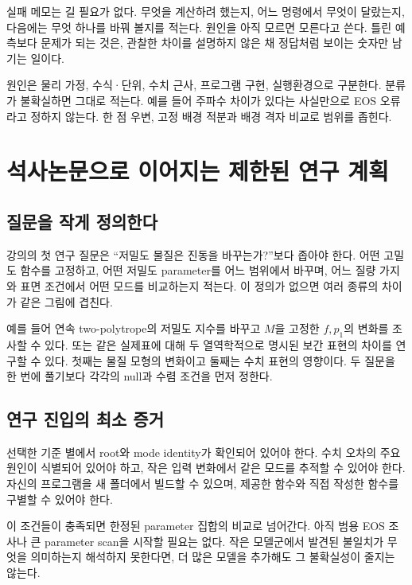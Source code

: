 \documentclass[
  10pt,
  a4paper,
]{article}
\begin{document}
실패 메모는 길 필요가 없다. 무엇을 계산하려 했는지, 어느 명령에서 무엇이
달랐는지, 다음에는 무엇 하나를 바꿔 볼지를 적는다. 원인을 아직 모르면
모른다고 쓴다. 틀린 예측보다 문제가 되는 것은, 관찰한 차이를 설명하지
않은 채 정답처럼 보이는 숫자만 남기는 일이다.

원인은 물리 가정, 수식·단위, 수치 근사, 프로그램 구현, 실행환경으로
구분한다. 분류가 불확실하면 그대로 적는다. 예를 들어 주파수 차이가
있다는 사실만으로 EOS 오류라고 정하지 않는다. 한 점 우변, 고정 배경
적분과 배경 격자 비교로 범위를 좁힌다.

\section{석사논문으로 이어지는 제한된 연구
계획}\label{uxc11duxc0acuxb17cuxbb38uxc73cuxb85c-uxc774uxc5b4uxc9c0uxb294-uxc81cuxd55cuxb41c-uxc5f0uxad6c-uxacc4uxd68d}

\subsection{질문을 작게
정의한다}\label{uxc9c8uxbb38uxc744-uxc791uxac8c-uxc815uxc758uxd55cuxb2e4}

강의의 첫 연구 질문은 ``저밀도 물질은 진동을 바꾸는가?''보다 좁아야
한다. 어떤 고밀도 함수를 고정하고, 어떤 저밀도 parameter를 어느 범위에서
바꾸며, 어느 질량 가지와 표면 조건에서 어떤 모드를 비교하는지 적는다. 이
정의가 없으면 여러 종류의 차이가 같은 그림에 겹친다.

예를 들어 연속 two-polytrope의 저밀도 지수를 바꾸고 \(M\)을 고정한
\(f,p_1\)의 변화를 조사할 수 있다. 또는 같은 실제표에 대해 두
열역학적으로 명시된 보간 표현의 차이를 연구할 수 있다. 첫째는 물질
모형의 변화이고 둘째는 수치 표현의 영향이다. 두 질문을 한 번에 풀기보다
각각의 null과 수렴 조건을 먼저 정한다.

\subsection{연구 진입의 최소
증거}\label{uxc5f0uxad6c-uxc9c4uxc785uxc758-uxcd5cuxc18c-uxc99duxac70}

선택한 기준 별에서 root와 mode identity가 확인되어 있어야 한다. 수치
오차의 주요 원인이 식별되어 있어야 하고, 작은 입력 변화에서 같은 모드를
추적할 수 있어야 한다. 자신의 프로그램을 새 폴더에서 빌드할 수 있으며,
제공한 함수와 직접 작성한 함수를 구별할 수 있어야 한다.

이 조건들이 충족되면 한정된 parameter 집합의 비교로 넘어간다. 아직 범용
EOS 조사나 큰 parameter scan을 시작할 필요는 없다. 작은 모델군에서
발견된 불일치가 무엇을 의미하는지 해석하지 못한다면, 더 많은 모델을
추가해도 그 불확실성이 줄지는 않는다.
\end{document}
